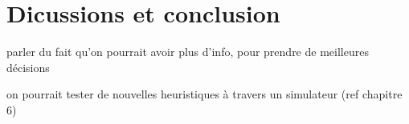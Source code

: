 \section{Dicussions et conclusion}


\begin{todo}

parler du fait qu'on pourrait avoir plus d'info, pour prendre de meilleures décisions

on pourrait tester de nouvelles heuristiques à travers un simulateur (ref chapitre 6)

\end{todo}

